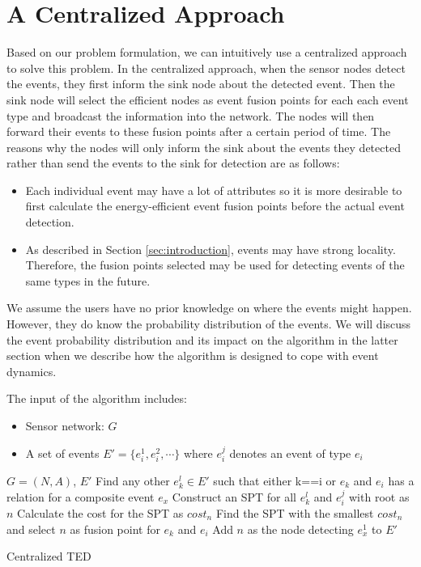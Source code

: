 \section{A Centralized Approach}
\label{sec:centralized}
Based on our problem formulation, we can intuitively use a centralized approach to solve this problem. In the centralized approach, when the sensor nodes detect the events, they first inform the sink node about the detected event. Then the sink node will select the efficient nodes as event fusion points for each each event type and broadcast the information into the network. The nodes will then forward their events to these fusion points after a certain period of time. The reasons why the nodes will only inform the sink about the events they detected rather than send the events to the sink for detection are as follows:
\begin{itemize}
\item Each individual event may have a lot of attributes so it is more desirable to first calculate the energy-efficient event fusion points before the actual event detection.
\item As described in Section \ref{sec:introduction}, events may have strong locality. Therefore, the fusion points selected may be used for detecting events of the same types in the future.
\end{itemize}

We assume the users have no prior knowledge on where the events might happen. However, they do know the probability distribution of the events. We will discuss the event probability distribution and its impact on the algorithm in the latter section when we describe how the algorithm is designed to cope with event dynamics.

The input of the algorithm includes:
\begin{itemize}
\item Sensor network: \(G\)
\item A set of events \(E'=\{e_i^1, e_i^2, \cdots \}\) where \(e_i^j\) denotes an event of type \(e_i\)
\end{itemize}

\begin{algorithm}
\begin{algorithmic}[1]
\REQUIRE \(G=(N,A)\), \(E'\)
			\STATE Find any other \(e_k^l\in E'\) such that either k==i or \(e_k\) and \(e_i\) has a relation for a composite event \(e_x\)
				\STATE Construct an SPT for all \(e_k^l\) and \(e_i^j\) with root as \(n\)
				\STATE Calculate the cost for the SPT as \(cost_n\)
			\ENDFOR
			\STATE Find the SPT with the smallest \(cost_n\) and select \(n\) as fusion point for \(e_k\) and \(e_i\)
			\STATE Add \(n\) as the node detecting \(e_x^1\) to \(E'\)
		\ENDIF
	\ENDFOR
\end{algorithmic}
\caption{Centralized TED}
\label{algo:centralizedTED}
\end{algorithm}

